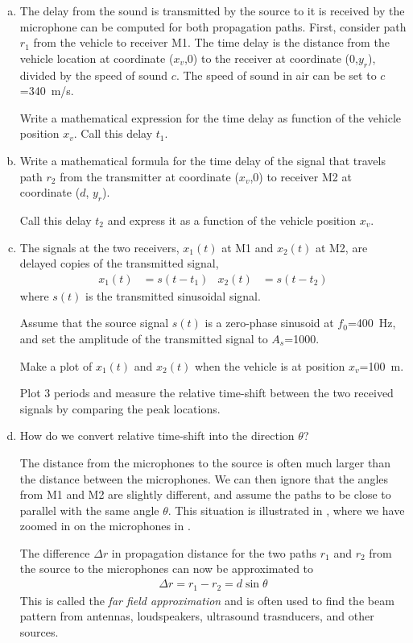 \begin{enumerate}[a)]
	\item The delay from the sound is transmitted by the source to it is received by the microphone can be computed for both propagation paths. First, consider path $r_1$ from the vehicle to receiver M1. The time delay is the distance from the vehicle location at coordinate ($x_v$,0) to the
	receiver at coordinate (0,$y_r$), divided by the speed of sound $c$.
	The speed of sound in air can be set to $c$=\qty{340}{m/s}. 
	
	Write a mathematical expression for the time delay as function of the vehicle position $x_v$. 
	Call this delay $t_1$.
		
	\item Write a mathematical formula for the time delay of the signal that travels path $r_2$ from the transmitter at coordinate ($x_v$,0) to receiver M2 at coordinate ($d$, $y_r$).
	
	Call this delay $t_2$ and express it as a function of the vehicle position $x_v$.
	
	\item The signals at the two receivers, $x_1(t)$ at M1 and $x_2(t)$ at M2, are delayed copies of the transmitted signal,
	\begin{align*}
		x_1(t)&= s(t-t_1)  &	x_2(t)&= s(t-t_2)  
	\end{align*}
	where $s(t)$ is the transmitted sinusoidal signal.
	
	Assume that the source signal $s(t)$ is a zero-phase sinusoid at $f_0$=\qty{400}{Hz}, and set the amplitude of the transmitted signal to $A_s$=\num{1000}. 
	
	Make a plot of $x_1(t)$ and $x_2(t)$ when the vehicle is at position $x_v$=\qty{100}{m}.
	
	Plot 3 periods and measure the relative time-shift between the two received
	signals by comparing the peak locations.
	
	\item How do we convert relative time-shift into the direction $\theta$?
	
	The distance from the microphones to the source is often much larger than the distance between the microphones. We can then ignore that the angles from M1 and M2 are slightly different, and assume the paths to be close to parallel with the same angle $\theta$. This situation is illustrated in , where we have zoomed in on the microphones in . 
	
	The difference $\Delta r$ in propagation distance for the two paths $r_1$ and $r_2$ from the source to the microphones can now be approximated to
	\begin{align}
		\Delta r = r_1-r_2 = d \sin\theta 
	\end{align}
	This is called the \emph{far field approximation} and is often used to find the beam pattern from antennas, loudspeakers, ultrasound trasnducers, and other sources.
	

\end{enumerate}
